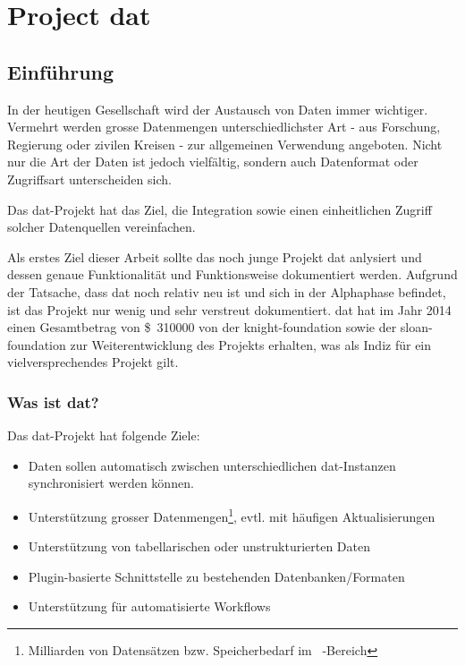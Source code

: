 \part{Project dat}\label{part:dat}

\chapter{Einführung}

In der heutigen Gesellschaft wird der Austausch von Daten immer wichtiger. Vermehrt werden grosse Datenmengen unterschiedlichster Art - aus Forschung, Regierung oder zivilen Kreisen - zur allgemeinen Verwendung angeboten. Nicht nur die Art der Daten ist jedoch vielfältig, sondern auch Datenformat oder Zugriffsart unterscheiden sich.

Das \gls{dat}-Projekt hat das Ziel, die Integration sowie einen einheitlichen Zugriff solcher Datenquellen vereinfachen.

Als erstes Ziel dieser Arbeit sollte das noch junge Projekt \gls{dat} anlysiert und dessen genaue Funktionalität und Funktionsweise dokumentiert werden. Aufgrund der Tatsache, dass \gls{dat} noch relativ neu ist und sich in der Alphaphase befindet, ist das Projekt nur wenig und sehr verstreut dokumentiert. \Gls{dat} hat im Jahr 2014 einen Gesamtbetrag von \SI{310000}[\$]{} von der \gls{knight-foundation} sowie der \gls{sloan-foundation} zur Weiterentwicklung des Projekts erhalten, was als Indiz für ein vielversprechendes Projekt gilt.

\section{Was ist dat?} %

Das dat-Projekt hat folgende Ziele\cite{what-is-dat}: 

\begin{itemize}
\item Daten sollen automatisch zwischen unterschiedlichen dat-Instanzen synchronisiert werden können. 
\item Unterstützung grosser Datenmengen\footnote{Milliarden von Datensätzen bzw. Speicherbedarf im \si{\tera\byte}-Bereich}, evtl. mit häufigen Aktualisierungen
\item Unterstützung von tabellarischen oder unstrukturierten Daten
\item Plugin-basierte Schnittstelle zu bestehenden Datenbanken/Formaten
\item Unterstützung für automatisierte Workflows
\end{itemize}

